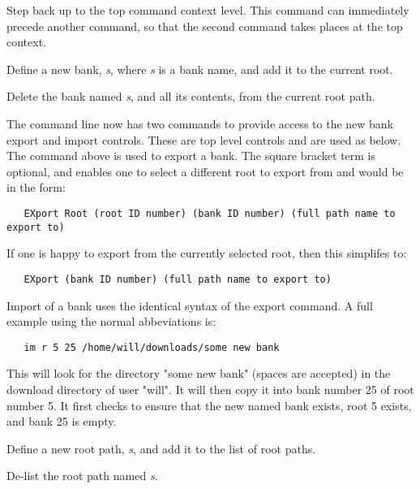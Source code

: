       Step back up to the top command context level.
      This command can immediately precede another command, so that the second
      command takes places at the top context.

      Define a new bank, \textsl{s}, where \textsl{s} is a bank name,
      and add it to the current root.

      Delete the bank named \textsl{s}, and all its contents,
      from the current root path.

      The command line now has two commands to provide access to the new bank
      export and import controls. These are top level controls and are used as
      below.  The command above is used to export a bank. The square bracket term
      is optional, and enables one to select a different root to export from and
      would be in the form:

\begin{verbatim}
   EXport Root (root ID number) (bank ID number) (full path name to export to)
\end{verbatim}

   If one is happy to export from the currently selected root, then this
   simplifes to:

\begin{verbatim}
   EXport (bank ID number) (full path name to export to)
\end{verbatim}

      Import of a bank uses the identical syntax of the export command.
      A full example using the normal abbeviations is:

\begin{verbatim}
   im r 5 25 /home/will/downloads/some new bank
\end{verbatim}

      This will look for the directory "some new bank" (spaces are accepted) in
      the download directory of user "will". It will then copy it into bank number
      25 of root number 5. It first checks to ensure that the new named bank
      exists, root 5 exists, and bank 25 is empty.

      Define a new root path, \textsl{s}, and add it to the list of root paths.

      De-list the root path named \textsl{s}.

